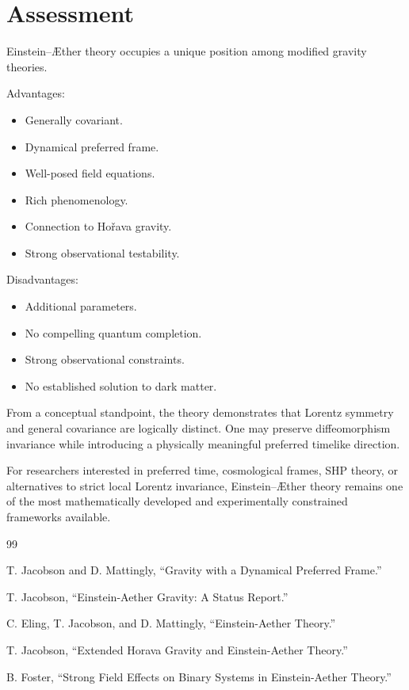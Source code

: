 \documentclass[11pt,a4paper]{article}
\begin{document}
\section{Assessment}

Einstein--\AE ther theory occupies a unique position among modified
gravity theories.

Advantages:

\begin{itemize}
\item Generally covariant.
\item Dynamical preferred frame.
\item Well-posed field equations.
\item Rich phenomenology.
\item Connection to Ho\v rava gravity.
\item Strong observational testability.
\end{itemize}

Disadvantages:

\begin{itemize}
\item Additional parameters.
\item No compelling quantum completion.
\item Strong observational constraints.
\item No established solution to dark matter.
\end{itemize}

From a conceptual standpoint, the theory demonstrates that
Lorentz symmetry and general covariance are logically distinct.
One may preserve diffeomorphism invariance while introducing a
physically meaningful preferred timelike direction.

For researchers interested in preferred time,
cosmological frames, SHP theory, or alternatives to strict local
Lorentz invariance, Einstein--\AE ther theory remains one of the
most mathematically developed and experimentally constrained
frameworks available.

\begin{thebibliography}{99}

T. Jacobson and D. Mattingly,
``Gravity with a Dynamical Preferred Frame.''

T. Jacobson,
``Einstein-Aether Gravity: A Status Report.''

C. Eling, T. Jacobson, and D. Mattingly,
``Einstein-Aether Theory.''

T. Jacobson,
``Extended Horava Gravity and Einstein-Aether Theory.''

B. Foster,
``Strong Field Effects on Binary Systems in Einstein-Aether Theory.''

\end{thebibliography}
\end{document}
